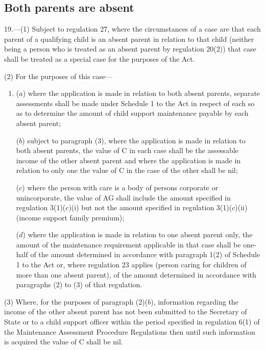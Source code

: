 \documentclass[a4paper]{article}
\newcommand{\parthead}{}
\begin{document}
\renewcommand\parthead{--- Part III}

\subsection[19. Both parents are absent]{Both parents are absent}

19.—(1) Subject to regulation 27, where the circumstances of a case are that each parent of a qualifying child is an absent parent in relation to that child (neither being a person who is treated as an absent parent by regulation 20(2)) that case shall be treated as a special case for the purposes of the Act.

(2) For the purposes of this case—
\begin{enumerate}\item[]
($a$) where the application is made in relation to both absent parents, separate assessments shall be made under Schedule 1 to the Act in respect of each so as to determine the amount of child support maintenance payable by each absent parent;

($b$) subject to paragraph (3), where the application is made in relation to both absent parents, the value of C in each case shall be the assessable income of the other absent parent and where the application is made in relation to only one the value of C in the case of the other shall be nil;

($c$) where the person with care is a body of persons corporate or unincorporate, the value of AG shall 
include the amount specified in regulation 3(1)($c$)(i) but not the amount specified in regulation 3(1)($c$)(ii) (income support family premium);  %

($d$) where the application is made in relation to one absent parent only, the amount of the maintenance requirement applicable in that case shall be one-half of the amount determined in accordance with paragraph 1(2) of Schedule 1 to the Act or, where regulation 23 applies (person caring for children of more than one absent parent), of the amount determined in accordance with paragraphs (2) to (3) of that regulation.
\end{enumerate}

(3) Where, for the purposes of paragraph (2)($b$), information regarding the income of the other absent parent has not been submitted to the Secretary of State or to a child support officer within the period specified in regulation 6(1) of the Maintenance Assessment Procedure Regulations then until such information is acquired the value of C shall be nil.
\end{document}
